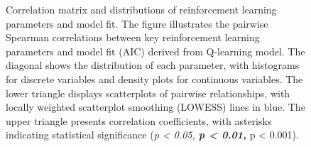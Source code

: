 \documentclass[
  number,
  preprint,
  3p,
  onecolumn]{elsarticle}
\begin{document}
\begin{figure}


\caption{\label{fig-corr-rl-params}Correlation matrix and distributions
of reinforcement learning parameters and model fit. The figure
illustrates the pairwise Spearman correlations between key reinforcement
learning parameters and model fit (AIC) derived from Q-learning model.
The diagonal shows the distribution of each parameter, with histograms
for discrete variables and density plots for continuous variables. The
lower triangle displays scatterplots of pairwise relationships, with
locally weighted scatterplot smoothing (LOWESS) lines in blue. The upper
triangle presents correlation coefficients, with asterisks indicating
statistical significance (\emph{p \textless{} 0.05, \textbf{p
\textless{} 0.01, }}p \textless{} 0.001).}

\end{figure}%
\end{document}
